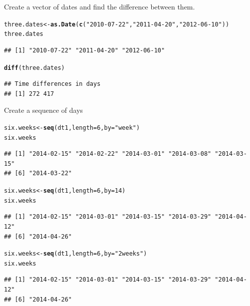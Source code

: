 \documentclass[12pt, a4paper, oneside]{article}\usepackage[]{graphicx}\usepackage[]{color}
\makeatletter
\newcommand{\hlnum}[1]{\textcolor[rgb]{0.686,0.059,0.569}{#1}}%
\newcommand{\hlstr}[1]{\textcolor[rgb]{0.192,0.494,0.8}{#1}}%
\newcommand{\hlstd}[1]{\textcolor[rgb]{0.345,0.345,0.345}{#1}}%
\newcommand{\hlkwb}[1]{\textcolor[rgb]{0.69,0.353,0.396}{#1}}%
\newcommand{\hlkwc}[1]{\textcolor[rgb]{0.333,0.667,0.333}{#1}}%
\newcommand{\hlkwd}[1]{\textcolor[rgb]{0.737,0.353,0.396}{\textbf{#1}}}%
\newenvironment{kframe}{%
 \def\at@end@of@kframe{}%
 \ifinner\ifhmode%
  \def\at@end@of@kframe{\end{minipage}}%
  \begin{minipage}{\columnwidth}%
 \fi\fi%
 \def\FrameCommand##1{\hskip\@totalleftmargin \hskip-\fboxsep
 \colorbox{shadecolor}{##1}\hskip-\fboxsep
     \hskip-\linewidth \hskip-\@totalleftmargin \hskip\columnwidth}%
 \MakeFramed {\advance\hsize-\width
   \@totalleftmargin\z@ \linewidth\hsize
   \@setminipage}}%
 {\par\unskip\endMakeFramed%
 \at@end@of@kframe}
\newenvironment{knitrout}{}{} %
\makeatother
\begin{document}
Create a vector of dates and find the difference between them. 
\begin{knitrout}
\color{fgcolor}\begin{kframe}
\begin{alltt}
\hlstd{three.dates} \hlkwb{<-} \hlkwd{as.Date}\hlstd{(}\hlkwd{c}\hlstd{(}\hlstr{"2010-07-22"}\hlstd{,} \hlstr{"2011-04-20"}\hlstd{,} \hlstr{"2012-06-10"}\hlstd{))}
\hlstd{three.dates}
\end{alltt}
\begin{verbatim}
## [1] "2010-07-22" "2011-04-20" "2012-06-10"
\end{verbatim}
\begin{alltt}
\hlkwd{diff}\hlstd{(three.dates)}
\end{alltt}
\begin{verbatim}
## Time differences in days
## [1] 272 417
\end{verbatim}
\end{kframe}
\end{knitrout}
Create a sequence of days
\begin{knitrout}
\color{fgcolor}\begin{kframe}
\begin{alltt}
\hlstd{six.weeks} \hlkwb{<-} \hlkwd{seq}\hlstd{(dt1,} \hlkwc{length} \hlstd{=} \hlnum{6}\hlstd{,} \hlkwc{by} \hlstd{=} \hlstr{"week"}\hlstd{)}
\hlstd{six.weeks}
\end{alltt}
\begin{verbatim}
## [1] "2014-02-15" "2014-02-22" "2014-03-01" "2014-03-08" "2014-03-15"
## [6] "2014-03-22"
\end{verbatim}
\begin{alltt}
\hlstd{six.weeks} \hlkwb{<-} \hlkwd{seq}\hlstd{(dt1,} \hlkwc{length} \hlstd{=} \hlnum{6}\hlstd{,} \hlkwc{by} \hlstd{=} \hlnum{14}\hlstd{)}
\hlstd{six.weeks}
\end{alltt}
\begin{verbatim}
## [1] "2014-02-15" "2014-03-01" "2014-03-15" "2014-03-29" "2014-04-12"
## [6] "2014-04-26"
\end{verbatim}
\begin{alltt}
\hlstd{six.weeks} \hlkwb{<-} \hlkwd{seq}\hlstd{(dt1,} \hlkwc{length} \hlstd{=} \hlnum{6}\hlstd{,} \hlkwc{by} \hlstd{=} \hlstr{"2 weeks"}\hlstd{)}
\hlstd{six.weeks}
\end{alltt}
\begin{verbatim}
## [1] "2014-02-15" "2014-03-01" "2014-03-15" "2014-03-29" "2014-04-12"
## [6] "2014-04-26"
\end{verbatim}
\end{kframe}
\end{knitrout}
\end{document}
